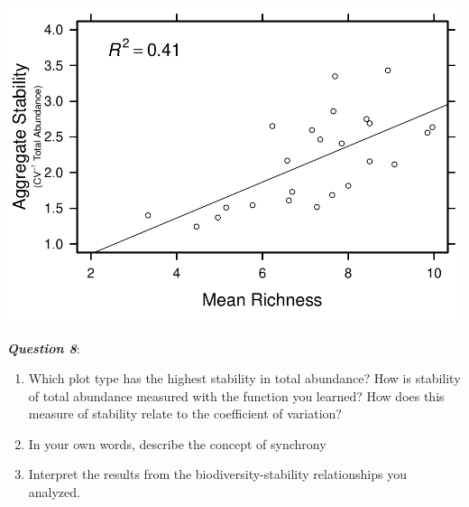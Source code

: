 \documentclass[]{article}
\newenvironment{Shaded}{\begin{snugshade}}{\end{snugshade}}
\newcommand{\KeywordTok}[1]{\textcolor[rgb]{0.13,0.29,0.53}{\textbf{{#1}}}}
\newcommand{\DataTypeTok}[1]{\textcolor[rgb]{0.13,0.29,0.53}{{#1}}}
\newcommand{\DecValTok}[1]{\textcolor[rgb]{0.00,0.00,0.81}{{#1}}}
\newcommand{\FloatTok}[1]{\textcolor[rgb]{0.00,0.00,0.81}{{#1}}}
\newcommand{\StringTok}[1]{\textcolor[rgb]{0.31,0.60,0.02}{{#1}}}
\newcommand{\NormalTok}[1]{{#1}}
\providecommand{\tightlist}{%
  \setlength{\itemsep}{0pt}\setlength{\parskip}{0pt}}
\begin{document}
\begin{Shaded}
\end{Shaded}

\includegraphics{temporal_assignment_files/figure-latex/unnamed-chunk-9-1.pdf}

\textbf{\emph{Question 8}}:

\begin{enumerate}
\def\labelenumi{\alph{enumi}.}
\tightlist
\item
  Which plot type has the highest stability in total abundance? How is
  stability of total abundance measured with the function you learned?
  How does this measure of stability relate to the coefficient of
  variation?
\item
  In your own words, describe the concept of synchrony
\item
  Interpret the results from the biodiversity-stability relationships
  you analyzed.
\end{enumerate}
\end{document}
